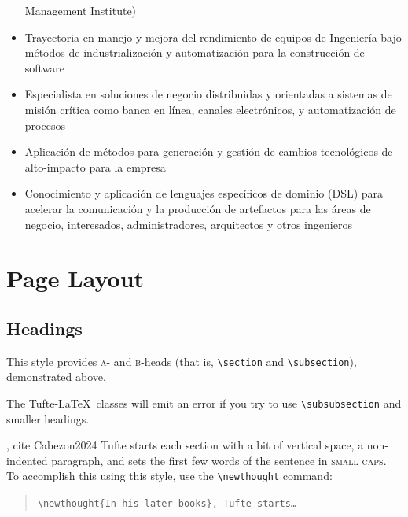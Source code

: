 \documentclass{tufte-handout}
\newcommand{\doccmd}[1]{\texttt{\textbackslash#1}}%
\newenvironment{docspec}{\begin{quote}\noindent}{\end{quote}}%
\begin{document}
\begin{itemize}
  Management Institute)
\item
  Trayectoria en manejo y mejora del rendimiento de equipos de
  Ingeniería bajo métodos de industrialización y automatización para la
  construcción de software
\item
  Especialista en soluciones de negocio distribuidas y orientadas a
  sistemas de misión crítica como banca en línea, canales electrónicos,
  y automatización de procesos
\item
  Aplicación de métodos para generación y gestión de cambios
  tecnológicos de alto-impacto para la empresa
\item
  Conocimiento y aplicación de lenguajes específicos de dominio (DSL)
  para acelerar la comunicación y la producción de artefactos para las
  áreas de negocio, interesados, administradores, arquitectos y otros
  ingenieros
\end{itemize}


\section{Page Layout}\label{sec:page-layout}
\subsection{Headings}\label{sec:headings}
This style provides \textsc{a}- and \textsc{b}-heads (that is, 
\Verb|\section| and \Verb|\subsection|), demonstrated above.

The Tufte-\LaTeX\ classes will emit an error if you try to use 
\linebreak\Verb|\subsubsection| and smaller headings.

, cite Cabezon2024 Tufte
starts each section with a bit of vertical space, a non-indented paragraph,
and sets the first few words of the sentence in \textsc{small caps}.  To
accomplish this using this style, use the \Verb|\newthought| command:  
\begin{docspec}
  \doccmd{newthought\{In his later books\}, Tufte starts\ldots}
\end{docspec}
\end{document}
